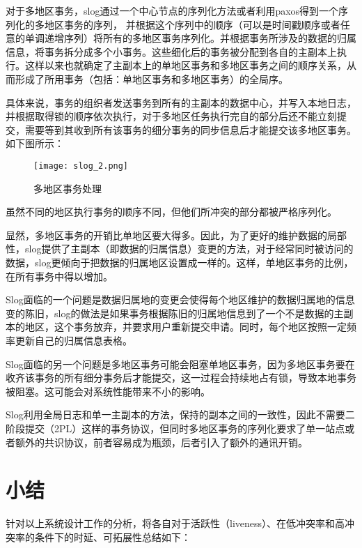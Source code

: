 对于多地区事务，slog通过一个中心节点的序列化方法或者利用paxos得到一个序列化的多地区事务的序列，
并根据这个序列中的顺序（可以是时间戳顺序或者任意的单调递增序列）将所有的多地区事务序列化。并根据事务所涉及的数据的归属信息，将事务拆分成多个小事务。这些细化后的事务被分配到各自的主副本上执行。这样以来也就确定了主副本上的单地区事务和多地区事务之间的顺序关系，从而形成了所用事务（包括：单地区事务和多地区事务）的全局序。

具体来说，事务的组织者发送事务到所有的主副本的数据中心，并写入本地日志，并根据取得锁的顺序依次执行，对于多地区任务执行完自的部分后还不能立刻提交，需要等到其收到所有该事务的细分事务的同步信息后才能提交该多地区事务。如下图所示：

\begin{figure}[htb]
  \centering
  \texttt{[image: slog\_2.png]}
  \caption{多地区事务处理}
  \label{fig:badge}
\end{figure}

虽然不同的地区执行事务的顺序不同，但他们所冲突的部分都被严格序列化。

显然，多地区事务的开销比单地区要大得多。因此，为了更好的维护数据的局部性，slog提供了主副本（即数据的归属信息）变更的方法，对于经常同时被访问的数据，slog更倾向于把数据的归属地区设置成一样的。这样，单地区事务的比例，在所有事务中得以增加。

Slog面临的一个问题是数据归属地的变更会使得每个地区维护的数据归属地的信息变的陈旧，slog的做法是如果事务根据陈旧的归属地信息到了一个不是数据的主副本的地区，这个事务放弃，并要求用户重新提交申请。同时，每个地区按照一定频率更新自己的归属信息表格。

Slog面临的另一个问题是多地区事务可能会阻塞单地区事务，因为多地区事务要在收齐该事务的所有细分事务后才能提交，这一过程会持续地占有锁，导致本地事务被阻塞。这可能会对系统性能带来不小的影响。

Slog利用全局日志和单一主副本的方法，保持的副本之间的一致性，因此不需要二阶段提交（2PL）这样的事务协议，但同时多地区事务的序列化要求了单一站点或者额外的共识协议，前者容易成为瓶颈，后者引入了额外的通讯开销。




\section{小结}

针对以上系统设计工作的分析，将各自对于活跃性（liveness）、在低冲突率和高冲突率的条件下的时延、可拓展性总结如下：

